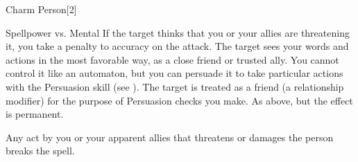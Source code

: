 \begin{spellsection}{Charm Person}[2]
    \begin{spellheader}
    \end{spellheader}
    \begin{spellcontent}
        \begin{spelltargetinginfo}
        \end{spelltargetinginfo}
        \begin{spelleffects}
            \begin{spellattack}{Spellpower vs. Mental}
                \spellspecial If the target thinks that you or your allies are threatening it, you take a  penalty to accuracy on the attack.
                \spellsuccess The target sees your words and actions in the most favorable way, as a close friend or trusted ally. You cannot control it like an automaton, but you can persuade it to take particular actions with the Persuasion skill (see ). The target is treated as a friend (a  relationship modifier) for the purpose of Persuasion checks you make.
                \spellcritical As above, but the effect is permanent.
            \end{spellattack}
            \spelldur \durlong
        \end{spelleffects}
    \end{spellcontent}
    \begin{spellfooter}
        \spellnotes Any act by you or your apparent allies that threatens or damages the  person breaks the spell.

        \subtlespellnotes

        \norepeatspellnotes
        \miscastrandom
    \end{spellfooter}
\end{spellsection}


